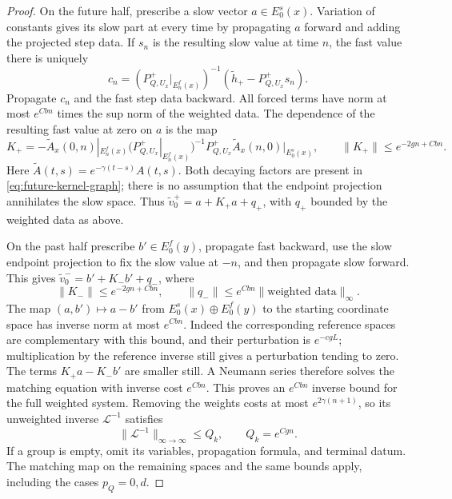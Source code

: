 \begin{proof}
On the future half, prescribe a slow vector $a\in E_0^s(x)$.
Variation of constants gives its slow part at every time by propagating
$a$ forward and adding the projected step data.  If $s_n$ is the
resulting slow value at time $n$, the fast value there is uniquely
\[
 c_n=(P^+_{Q,U_x}|_{E_n^f(x)})^{-1}
                (\widetilde h_+-P^+_{Q,U_x}s_n).
\]
Propagate $c_n$ and the fast step data backward.  All forced terms have
norm at most $e^{Cbn}$ times the sup norm of the weighted data.
The dependence of the resulting fast value at zero on $a$ is the map
\begin{equation}\label{eq:future-kernel-graph}
 K_+=-\widetilde A_x(0,n)|_{E_n^f(x)}
       (P^+_{Q,U_x}|_{E_n^f(x)})^{-1}
       P^+_{Q,U_x}\widetilde A_x(n,0)|_{E_0^s(x)},
 \qquad \|K_+\|\le e^{-2gn+Cbn}.
\end{equation}
Here $\widetilde A(t,s)=e^{-\gamma(t-s)}A(t,s)$.
Both decaying factors are present in \eqref{eq:future-kernel-graph};
there is no assumption that the endpoint projection annihilates the
slow space.  Thus $\widetilde v_0^+=a+K_+a+q_+$, with $q_+$ bounded
by the weighted data as above.

On the past half prescribe $b'\in E_0^f(y)$, propagate fast backward,
use the slow endpoint projection to fix the slow value at $-n$, and
then propagate slow forward.  This gives
$\widetilde v_0^-=b'+K_-b'+q_-$, where
\begin{equation}\label{eq:past-kernel-graph}
 \|K_-\|\le e^{-2gn+Cbn},\qquad
 \|q_-\|\le e^{Cbn}\|\text{weighted data}\|_{\infty}.
\end{equation}
The map $(a,b')\mapsto a-b'$ from $E_0^s(x)\oplus E_0^f(y)$ to
the starting coordinate space has inverse norm at most $e^{Cbn}$.
Indeed the corresponding reference spaces are complementary with this
bound, and their perturbation is $e^{-cgL}$; multiplication by the
reference inverse still gives a perturbation tending to zero.
The terms $K_+a-K_-b'$ are smaller still.  A Neumann series therefore
solves the matching equation with inverse cost $e^{Cbn}$.
This proves an $e^{Cbn}$ inverse bound for the full weighted system.
Removing the weights costs at most $e^{2\gamma(n+1)}$, so its
unweighted inverse $\mathcal L^{-1}$ satisfies
\begin{equation}\label{eq:boundary-inverse}
 \|\mathcal L^{-1}\|_{\infty\to\infty}\le Q_k,
 \qquad Q_k=e^{Cgn}.
\end{equation}
If a group is empty, omit its variables, propagation formula, and
terminal datum.  The matching map on the remaining spaces and the
same bounds apply, including the cases $p_Q=0,d$.


\end{proof}

